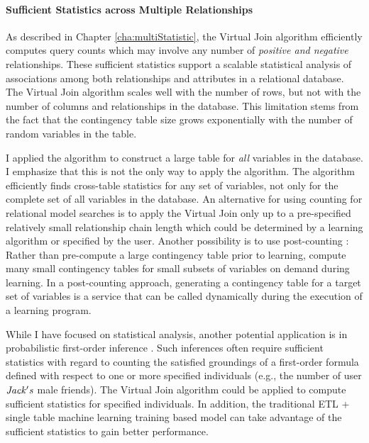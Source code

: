 \documentclass{sfuthesis}
\begin{document}
\paragraph{Sufficient Statistics across Multiple Relationships} 
As described  in Chapter \ref{cha:multiStatistic}, the Virtual Join algorithm efficiently computes query counts which may involve any number of {\em positive and negative }relationships. These sufficient statistics support a scalable statistical analysis of associations among both relationships and attributes in a relational database. The Virtual Join algorithm scales well with the number of rows, but not with the number of columns and relationships in the database. This limitation stems from the fact that the contingency table size grows exponentially with the number of random variables in the table. 

I applied the algorithm to construct a large table for {\em all} variables in the database. I emphasize that this is not the only way to apply the algorithm. The algorithm efficiently finds cross-table statistics for any set of variables, not only for the complete set of all variables in the database. An alternative for using counting for relational model searches is to apply the Virtual Join only up to a pre-specified relatively small relationship chain length which could be determined by a learning algorithm or specified by the user. Another possibility is to use post-counting \cite{lv2012}: Rather than pre-compute a large contingency table prior to learning, compute many small contingency tables for  small subsets of variables on demand during learning. In a post-counting approach, generating a contingency table for a target set of variables is a service that can be called dynamically during the execution of a learning program. 

While I  have focused on statistical analysis, another potential application is in probabilistic first-order inference \cite{Poole2003, Hari2016}. Such inferences often require sufficient statistics with regard to counting the satisfied groundings of a first-order formula defined with respect to one or more specified individuals  (e.g.,  the number of user $\it{Jack's}$ male friends). The Virtual Join algorithm could be applied to compute sufficient statistics for specified individuals. 
In addition, the traditional ETL + single table machine learning training based model can take advantage of the sufficient statistics to gain better performance.
\end{document}
